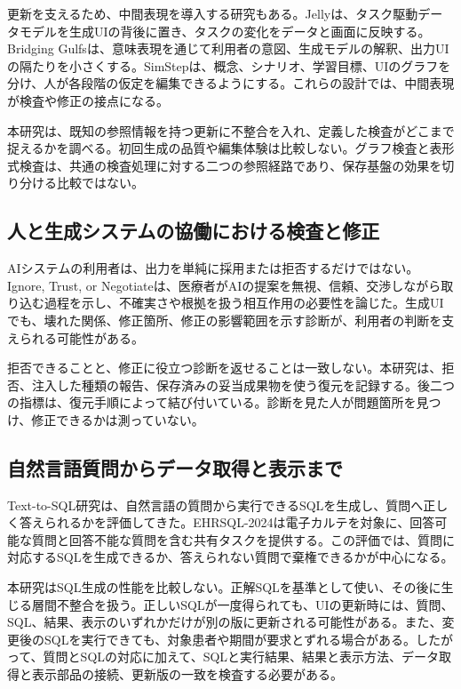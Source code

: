 \documentclass[manuscript,review,anonymous]{acmart}
\begin{document}
更新を支えるため、中間表現を導入する研究もある。Jellyは、タスク駆動データモデルを生成UIの背後に置き、タスクの変化をデータと画面に反映する\cite{cao2025jelly}。Bridging Gulfsは、意味表現を通じて利用者の意図、生成モデルの解釈、出力UIの隔たりを小さくする\cite{park2026bridging}。SimStepは、概念、シナリオ、学習目標、UIのグラフを分け、人が各段階の仮定を編集できるようにする\cite{kaputa2026simstep}。これらの設計では、中間表現が検査や修正の接点になる。

本研究は、既知の参照情報を持つ更新に不整合を入れ、定義した検査がどこまで捉えるかを調べる。初回生成の品質や編集体験は比較しない。グラフ検査と表形式検査は、共通の検査処理に対する二つの参照経路であり、保存基盤の効果を切り分ける比較ではない。

\subsection{人と生成システムの協働における検査と修正}

AIシステムの利用者は、出力を単純に採用または拒否するだけではない。Ignore, Trust, or Negotiateは、医療者がAIの提案を無視、信頼、交渉しながら取り込む過程を示し、不確実さや根拠を扱う相互作用の必要性を論じた\cite{sivaraman2023ignore}。生成UIでも、壊れた関係、修正箇所、修正の影響範囲を示す診断が、利用者の判断を支えられる可能性がある。

拒否できることと、修正に役立つ診断を返せることは一致しない。本研究は、拒否、注入した種類の報告、保存済みの妥当成果物を使う復元を記録する。後二つの指標は、復元手順によって結び付いている。診断を見た人が問題箇所を見つけ、修正できるかは測っていない。

\subsection{自然言語質問からデータ取得と表示まで}

Text-to-SQL研究は、自然言語の質問から実行できるSQLを生成し、質問へ正しく答えられるかを評価してきた。EHRSQL-2024は電子カルテを対象に、回答可能な質問と回答不能な質問を含む共有タスクを提供する\cite{lee2024ehrsql}。この評価では、質問に対応するSQLを生成できるか、答えられない質問で棄権できるかが中心になる。

本研究はSQL生成の性能を比較しない。正解SQLを基準として使い、その後に生じる層間不整合を扱う。正しいSQLが一度得られても、UIの更新時には、質問、SQL、結果、表示のいずれかだけが別の版に更新される可能性がある。また、変更後のSQLを実行できても、対象患者や期間が要求とずれる場合がある。したがって、質問とSQLの対応に加えて、SQLと実行結果、結果と表示方法、データ取得と表示部品の接続、更新版の一致を検査する必要がある。
\end{document}

